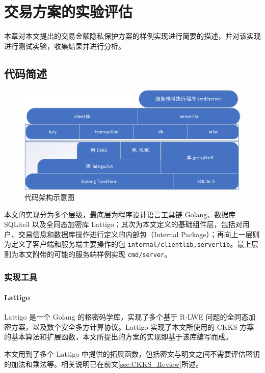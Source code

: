 \chapter{交易方案的实验评估}

本章对本文提出的交易金额隐私保护方案的样例实现进行简要的描述，并对该实现进行测试实验，收集结果并进行分析。

\section{代码简述}

\begin{figure}[ht]
    \centering
    \includegraphics[width=0.8\linewidth]{Figures/abstract_on_chimata.png}
    \caption{代码架构示意图}\label{Fig:Design}
\end{figure}

本文的实现分为多个层级，最底层为程序设计语言工具链 Golang、数据库 SQLite3 以及全同态加密库 Lattigo；其次为本文定义的基础组件层，包括对用户、交易信息和数据库操作进行定义的内部包（Internal Package）；再向上一层则为定义了客户端和服务端主要操作的包 \verb|internal/clientlib,serverlib|。最上层则为本文附带的可能的服务端样例实现 \verb|cmd/server|。

\subsection{实现工具}

\subsubsection*{Lattigo}

Lattigo 是一个 Golang 的格密码学库，实现了多个基于 R-LWE 问题的全同态加密方案，以及数个安全多方计算协议\cite{Mouchet2020LattigoAM,lattigoRepo}。Lattigo 实现了本文所使用的 CKKS 方案的基本算法和扩展函数，本文所提出的方案的实现即基于该库编写而成。

本文用到了多个 Lattigo 中提供的拓展函数，包括密文与明文之间不需要评估密钥的加法和乘法等。相关说明已在前文\ref{sec:CKKS_Review}所述。

